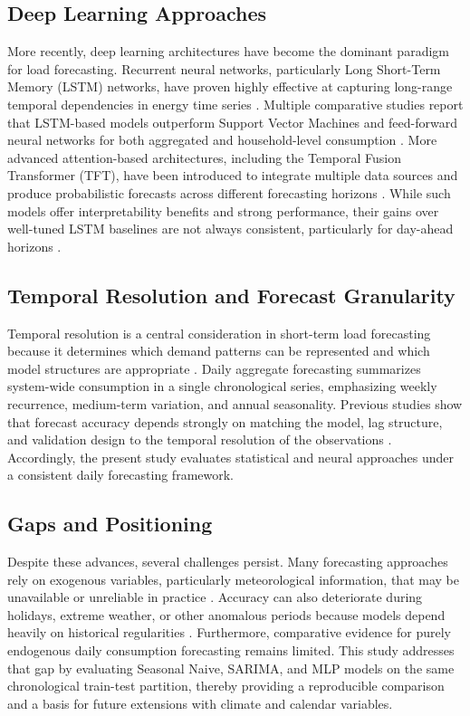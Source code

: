 \documentclass{ieeeaccess}
\begin{document}
\subsection{Deep Learning Approaches}
More recently, deep learning architectures have become the dominant paradigm for load forecasting. Recurrent neural networks, particularly Long Short-Term Memory (LSTM) networks, have proven highly effective at capturing long-range temporal dependencies in energy time series \cite{ref8,ref10}. Multiple comparative studies report that LSTM-based models outperform Support Vector Machines and feed-forward neural networks for both aggregated and household-level consumption \cite{ref9,ref10}. More advanced attention-based architectures, including the Temporal Fusion Transformer (TFT), have been introduced to integrate multiple data sources and produce probabilistic forecasts across different forecasting horizons \cite{ref5}. While such models offer interpretability benefits and strong performance, their gains over well-tuned LSTM baselines are not always consistent, particularly for day-ahead horizons \cite{ref5}.

\subsection{Temporal Resolution and Forecast Granularity}
Temporal resolution is a central consideration in short-term load forecasting because it determines which demand patterns can be represented and which model structures are appropriate \cite{ref1,ref4}. Daily aggregate forecasting summarizes system-wide consumption in a single chronological series, emphasizing weekly recurrence, medium-term variation, and annual seasonality. Previous studies show that forecast accuracy depends strongly on matching the model, lag structure, and validation design to the temporal resolution of the observations \cite{ref5,ref11}. Accordingly, the present study evaluates statistical and neural approaches under a consistent daily forecasting framework.

\subsection{Gaps and Positioning}
Despite these advances, several challenges persist. Many forecasting approaches rely on exogenous variables, particularly meteorological information, that may be unavailable or unreliable in practice \cite{ref4,ref6}. Accuracy can also deteriorate during holidays, extreme weather, or other anomalous periods because models depend heavily on historical regularities \cite{ref5,ref11}. Furthermore, comparative evidence for purely endogenous daily consumption forecasting remains limited. This study addresses that gap by evaluating Seasonal Naive, SARIMA, and MLP models on the same chronological train-test partition, thereby providing a reproducible comparison and a basis for future extensions with climate and calendar variables.
\end{document}

